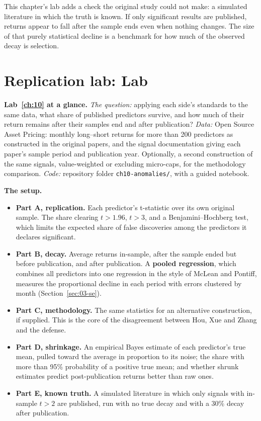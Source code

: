 This chapter's lab adds a check the original study could not make: a simulated literature in which the truth is known. If only significant results are published, returns appear to fall after the sample ends even when nothing changes. The size of that purely statistical decline is a benchmark for how much of the observed decay is selection.

\section{Replication lab: Lab~\thechapter}
\label{sec:10-lab}

\begin{callout}
\textbf{Lab~\ref{ch:10} at a glance.} \emph{The question:} applying each side's standards to the same data, what share of published predictors survive, and how much of their return remains after their samples end and after publication? \emph{Data:} Open Source Asset Pricing: monthly long--short returns for more than 200 predictors as constructed in the original papers, and the signal documentation giving each paper's sample period and publication year. Optionally, a second construction of the same signals, value-weighted or excluding micro-caps, for the methodology comparison. \emph{Code:} repository folder \texttt{ch10-anomalies/}, with a guided notebook.
\end{callout}

\textbf{The setup.}

\begin{itemize}
  \item \textbf{Part A, replication.} Each predictor's t-statistic over its own original sample. The share clearing $t > 1.96$, $t > 3$, and a Benjamini--Hochberg test, which limits the expected share of false discoveries among the predictors it declares significant.
  \item \textbf{Part B, decay.} Average returns in-sample, after the sample ended but before publication, and after publication. A \textbf{pooled regression}, which combines all predictors into one regression in the style of McLean and Pontiff, measures the proportional decline in each period with errors clustered by month (Section~\ref{sec:03-se}).
  \item \textbf{Part C, methodology.} The same statistics for an alternative construction, if supplied. This is the core of the disagreement between Hou, Xue and Zhang and the defense.
  \item \textbf{Part D, shrinkage.} An empirical Bayes estimate of each predictor's true mean, pulled toward the average in proportion to its noise; the share with more than 95\% probability of a positive true mean; and whether shrunk estimates predict post-publication returns better than raw ones.
  \item \textbf{Part E, known truth.} A simulated literature in which only signals with in-sample $t > 2$ are published, run with no true decay and with a 30\% decay after publication.
\end{itemize}

